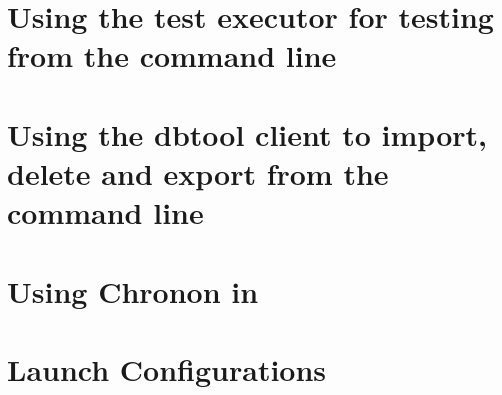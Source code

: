 \clearpage

\section{Using the test executor for testing from the command line}


\section{Using the dbtool client to import, delete and export from the command line}
\label{DBTool}



\section{Using Chronon in \app{}}
\label{TasksChronon}
 

\section{Launch Configurations}
\label{LaunchConfigurations}

